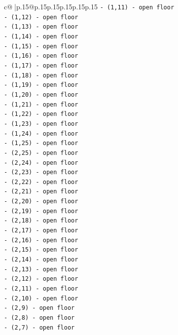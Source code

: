 \documentclass{article}
\begin{document}
{\begin{supertabular}{c@{$\;$}|p{.15\linewidth}@{}p{.15\linewidth}p{.15\linewidth}p{.15\linewidth}p{.15\linewidth}p{.15\linewidth}}
{{{\texttt{{-} (1,11) {-} open floor} \\
\texttt{{-} (1,12) {-} open floor} \\
\texttt{{-} (1,13) {-} open floor} \\
\texttt{{-} (1,14) {-} open floor} \\
\texttt{{-} (1,15) {-} open floor} \\
\texttt{{-} (1,16) {-} open floor} \\
\texttt{{-} (1,17) {-} open floor} \\
\texttt{{-} (1,18) {-} open floor} \\
\texttt{{-} (1,19) {-} open floor} \\
\texttt{{-} (1,20) {-} open floor} \\
\texttt{{-} (1,21) {-} open floor} \\
\texttt{{-} (1,22) {-} open floor} \\
\texttt{{-} (1,23) {-} open floor} \\
\texttt{{-} (1,24) {-} open floor} \\
\texttt{{-} (1,25) {-} open floor} \\
\texttt{{-} (2,25) {-} open floor} \\
\texttt{{-} (2,24) {-} open floor} \\
\texttt{{-} (2,23) {-} open floor} \\
\texttt{{-} (2,22) {-} open floor} \\
\texttt{{-} (2,21) {-} open floor} \\
\texttt{{-} (2,20) {-} open floor} \\
\texttt{{-} (2,19) {-} open floor} \\
\texttt{{-} (2,18) {-} open floor} \\
\texttt{{-} (2,17) {-} open floor} \\
\texttt{{-} (2,16) {-} open floor} \\
\texttt{{-} (2,15) {-} open floor} \\
\texttt{{-} (2,14) {-} open floor} \\
\texttt{{-} (2,13) {-} open floor} \\
\texttt{{-} (2,12) {-} open floor} \\
\texttt{{-} (2,11) {-} open floor} \\
\texttt{{-} (2,10) {-} open floor} \\
\texttt{{-} (2,9) {-} open floor} \\
\texttt{{-} (2,8) {-} open floor} \\
\texttt{{-} (2,7) {-} open floor} \\
}}}
\end{supertabular}}
\end{document}
